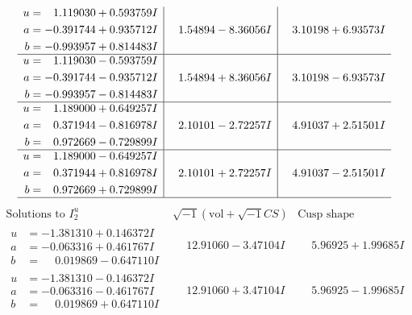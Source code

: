 \documentclass[1p]{elsarticle_modified}
\theoremstyle{definition}
\newcommand{\I}{\sqrt{-1}}
\begin{document}
$$\begin{array}{c|c|c}
\begin{aligned}
u &= \phantom{-}1.119030 + 0.593759 I \\
a &= -0.391744 + 0.935712 I \\
b &= -0.993957 + 0.814483 I\end{aligned}
 & \phantom{-}1.54894 - 8.36056 I & \phantom{-}3.10198 + 6.93573 I \\ \hline\begin{aligned}
u &= \phantom{-}1.119030 - 0.593759 I \\
a &= -0.391744 - 0.935712 I \\
b &= -0.993957 - 0.814483 I\end{aligned}
 & \phantom{-}1.54894 + 8.36056 I & \phantom{-}3.10198 - 6.93573 I \\ \hline\begin{aligned}
u &= \phantom{-}1.189000 + 0.649257 I \\
a &= \phantom{-}0.371944 - 0.816978 I \\
b &= \phantom{-}0.972669 - 0.729899 I\end{aligned}
 & \phantom{-}2.10101 - 2.72257 I & \phantom{-}4.91037 + 2.51501 I \\ \hline\begin{aligned}
u &= \phantom{-}1.189000 - 0.649257 I \\
a &= \phantom{-}0.371944 + 0.816978 I \\
b &= \phantom{-}0.972669 + 0.729899 I\end{aligned}
 & \phantom{-}2.10101 + 2.72257 I & \phantom{-}4.91037 - 2.51501 I\\
 \hline 
 \end{array}$$\newpage$$\begin{array}{c|c|c}  
\text{Solutions to }I^u_{2}& \I (\text{vol} + \sqrt{-1}CS) & \text{Cusp shape}\\
 \hline 
\begin{aligned}
u &= -1.381310 + 0.146372 I \\
a &= -0.063316 + 0.461767 I \\
b &= \phantom{-}0.019869 - 0.647110 I\end{aligned}
 & \phantom{-}12.91060 - 3.47104 I & \phantom{-}5.96925 + 1.99685 I \\ \hline\begin{aligned}
u &= -1.381310 - 0.146372 I \\
a &= -0.063316 - 0.461767 I \\
b &= \phantom{-}0.019869 + 0.647110 I\end{aligned}
 & \phantom{-}12.91060 + 3.47104 I & \phantom{-}5.96925 - 1.99685 I \\ \hline\begin{aligned}

\end{aligned}
\end{array}$$
\end{document}
